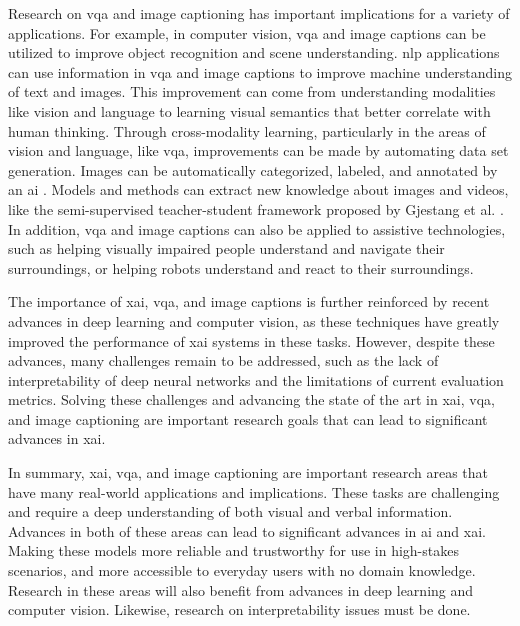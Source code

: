 Research on \gls{vqa} and image captioning has important implications for a variety of applications. For example, in computer vision, \gls{vqa} and image captions can be utilized to improve object recognition and scene understanding. \gls{nlp} applications can use information in \gls{vqa} and image captions to improve machine understanding of text and images. This improvement can come from understanding modalities like vision and language to learning visual semantics that better correlate with human thinking. Through cross-modality learning, particularly in the areas of vision and language, like \gls{vqa}, improvements can be made by automating data set generation. Images can be automatically categorized, labeled, and annotated by an \gls{ai} \cite{lancasterAutomatedLabelingHuman1997, mnihMachineLearningAerial}. Models and methods can extract new knowledge about images and videos, like the semi-supervised teacher-student framework proposed by Gjestang et al. \cite{gjestangSelflearningTeacherstudentFramework2021}.
In addition, \gls{vqa} and image captions can also be applied to assistive technologies, such as helping visually impaired people understand and navigate their surroundings, or helping robots understand and react to their surroundings.

The importance of \gls{xai}, \gls{vqa}, and image captions is further reinforced by recent advances in deep learning and computer vision, as these techniques have greatly improved the performance of \gls{xai} systems in these tasks. 
However, despite these advances, many challenges remain to be addressed, such as the lack of interpretability of deep neural networks and the limitations of current evaluation metrics. Solving these challenges and advancing the state of the art in \gls{xai}, \gls{vqa}, and image captioning are important research goals that can lead to significant advances in \gls{xai}.

In summary, \gls{xai}, \gls{vqa}, and image captioning are important research areas that have many real-world applications and implications. 
These tasks are challenging and require a deep understanding of both visual and verbal information. Advances in both of these areas can lead to significant advances in \gls{ai} and \gls{xai}. Making these models more reliable and trustworthy for use in high-stakes scenarios, and more accessible to everyday users with no domain knowledge. 
Research in these areas will also benefit from advances in deep learning and computer vision. Likewise, research on interpretability issues must be done.
